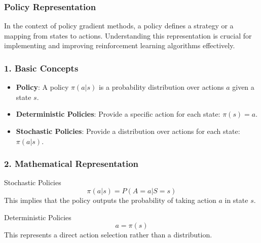 \documentclass[aspectratio=169]{beamer}
\begin{document}
\begin{frame}[fragile]
  \frametitle{Policy Representation}
  In the context of policy gradient methods, a policy defines a strategy or a mapping from states to actions. 
  Understanding this representation is crucial for implementing and improving reinforcement learning algorithms effectively.
\end{frame}

\begin{frame}[fragile]
  \frametitle{1. Basic Concepts}
  \begin{itemize}
    \item \textbf{Policy}: A policy \( \pi(a|s) \) is a probability distribution over actions \( a \) given a state \( s \).
    \item \textbf{Deterministic Policies}: Provide a specific action for each state: \( \pi(s) = a \).
    \item \textbf{Stochastic Policies}: Provide a distribution over actions for each state: \( \pi(a|s) \).
  \end{itemize}
\end{frame}

\begin{frame}[fragile]
  \frametitle{2. Mathematical Representation}
  \begin{block}{Stochastic Policies}
    \begin{equation}
      \pi(a|s) = P(A = a | S = s)
    \end{equation}
    This implies that the policy outputs the probability of taking action \( a \) in state \( s \).
  \end{block}

  \begin{block}{Deterministic Policies}
    \begin{equation}
      a = \pi(s)
    \end{equation}
    This represents a direct action selection rather than a distribution.
  \end{block}
\end{frame}
\end{document}
